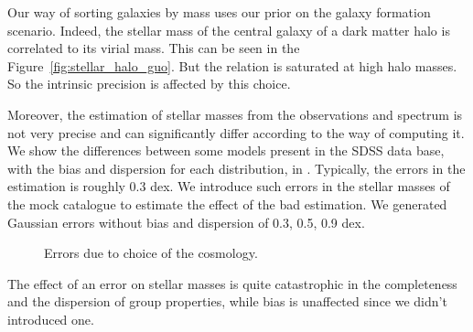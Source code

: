 Our way of sorting galaxies by mass uses our prior on the galaxy formation
scenario. Indeed, the stellar mass of the central galaxy of a dark matter halo
is correlated to its virial mass. This can be seen in the
Figure~\ref{fig:stellar_halo_guo}. But the relation is saturated at high halo
masses. So the intrinsic precision is affected by this choice.

Moreover, the estimation of stellar masses from the observations and spectrum
is not very precise and can significantly differ according to the way of
computing it. We show the differences between some models present in the SDSS
data base, with the bias and dispersion for each distribution, in
.
%
Typically, the errors in the estimation is roughly 0.3 dex. We introduce such
errors in the stellar masses of the mock catalogue to estimate the effect of
the bad estimation. We generated Gaussian errors without bias and dispersion of
0.3, 0.5, 0.9 dex.
%
\begin{figure}[tb]
    \centering
    \begin{minipage}{0.49\linewidth}
    \end{minipage}
    \begin{minipage}{0.49\linewidth}
    \end{minipage}
    \caption{\label{fig:cdf_errors_stellar}}
\end{figure}
%
\begin{figure}[tb]
    \centering
    \begin{minipage}{0.49\linewidth}
    \end{minipage}
    \begin{minipage}{0.49\linewidth}
    \end{minipage}
    \begin{minipage}{0.49\linewidth}
    \end{minipage}
    \caption{Errors due to choice of the
    cosmology.\label{fig:bias_disp_cosmology}}
\end{figure}
%
The effect of an error on stellar masses is quite catastrophic in the
completeness and the dispersion of group properties, while bias is
unaffected since we didn't introduced one.

